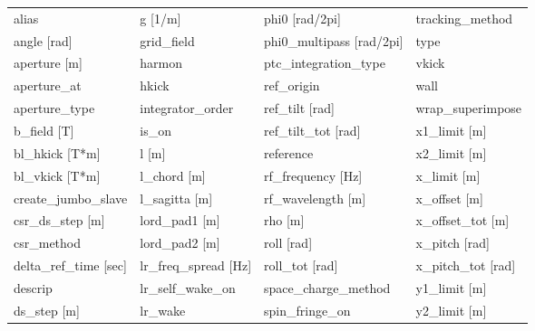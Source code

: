  \begin{tabular}{llll} \toprule
alias                            & g [1/m]                          & phi0 [rad/2pi]                   & tracking_method                  \\
angle [rad]                      & grid_field                       & phi0_multipass [rad/2pi]         & type                             \\
aperture [m]                     & harmon                           & ptc_integration_type             & vkick                            \\
aperture_at                      & hkick                            & ref_origin                       & wall                             \\
aperture_type                    & integrator_order                 & ref_tilt [rad]                   & wrap_superimpose                 \\
b_field [T]                      & is_on                            & ref_tilt_tot [rad]               & x1_limit [m]                     \\
bl_hkick [T*m]                   & l [m]                            & reference                        & x2_limit [m]                     \\
bl_vkick [T*m]                   & l_chord [m]                      & rf_frequency [Hz]                & x_limit [m]                      \\
create_jumbo_slave               & l_sagitta [m]                    & rf_wavelength [m]                & x_offset [m]                     \\
csr_ds_step [m]                  & lord_pad1 [m]                    & rho [m]                          & x_offset_tot [m]                 \\
csr_method                       & lord_pad2 [m]                    & roll [rad]                       & x_pitch [rad]                    \\
delta_ref_time [sec]             & lr_freq_spread [Hz]              & roll_tot [rad]                   & x_pitch_tot [rad]                \\
descrip                          & lr_self_wake_on                  & space_charge_method              & y1_limit [m]                     \\
ds_step [m]                      & lr_wake                          & spin_fringe_on                   & y2_limit [m]                     \\

\end{tabular}
